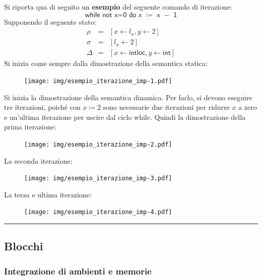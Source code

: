 \documentclass[a4paper]{article}
\newcommand{\longline}{\noindent\rule{\textwidth}{0.4pt}}
\begin{document}
 	\noindent
 	Si riporta qua di seguito un \textcolor{Green4}{\textbf{esempio}} del seguente comando di iterazione:
 	\begin{equation*}
 		\textsf{while not x=0 do x $\coloneq$ x $-$ 1}
 	\end{equation*}
 	Supponendo il seguente stato:
 	\begin{equation*}
 		\begin{array}{lll}
 			\rho 	& = & \left[x \leftarrow l_{x}, y \leftarrow 2\right] \\
 			\sigma	& = & \left[l_{x} \leftarrow 2\right] \\
 			\Delta	& = & \left[x \leftarrow \mathsf{intloc}, y \leftarrow \mathsf{int}\right]
 		\end{array}
 	\end{equation*}
 	Si inizia come sempre dalla dimostrazione della semantica statica:
 	\begin{figure}[!htp]
 		\centering
 		\texttt{[image: img/esempio\_iterazione\_imp-1.pdf]}
 	\end{figure}\newpage
 	
 	\noindent
 	Si inizia la dimostrazione della semantica dinamica. Per farlo, si devono eseguire tre iterazioni, poiché con $x\coloneq2$ sono necessarie due iterazioni per ridurre $x$ a zero e un'ultima iterazione per uscire dal ciclo \textsf{while}. Quindi la dimostrazione della prima iterazione:
 	\begin{figure}[!htp]
 		\centering
 		\texttt{[image: img/esempio\_iterazione\_imp-2.pdf]}
 	\end{figure}
 	
 	\noindent
 	La seconda iterazione:
 	\begin{figure}[!htp]
 		\centering
 		\texttt{[image: img/esempio\_iterazione\_imp-3.pdf]}
 	\end{figure}\newpage
 	
 	\noindent
 	La terza e ultima iterazione:
 	\begin{figure}[!htp]
 		\centering
 		\texttt{[image: img/esempio\_iterazione\_imp-4.pdf]}
 	\end{figure}
 	
 	\longline
 	
 	\subsection{Blocchi}\label{blocchi}
 	
 	\subsubsection{Integrazione di ambienti e memorie}
 	
\end{document}
